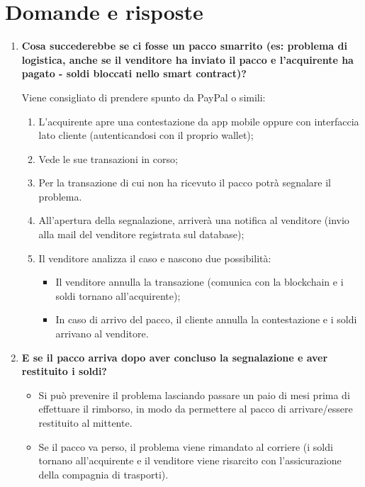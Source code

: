 \documentclass[11pt]{article}
\begin{document}
		\newpage
		
		\section{Domande e risposte}
			\begin{enumerate}
				\item \textbf{Cosa succederebbe se ci fosse un pacco smarrito (es: problema di logistica, anche se il venditore
				ha inviato il pacco e l'acquirente ha pagato - soldi bloccati nello smart contract)?}
				
				\medskip		
						
				Viene consigliato di prendere spunto da PayPal o simili: 
				\begin{enumerate}
					\item L'acquirente apre una contestazione da app mobile oppure con interfaccia lato cliente
					(autenticandosi con il proprio wallet);
					\item Vede le sue transazioni in corso;
					\item Per la transazione di cui non ha ricevuto il pacco potrà segnalare il problema.
					\item All'apertura della segnalazione, arriverà una notifica al venditore (invio alla mail del venditore
					registrata sul database);
					\item Il venditore analizza il caso e nascono due possibilità: 
						\begin{itemize}
							\item Il venditore annulla la transazione (comunica con la blockchain e i soldi tornano all'acquirente); 
							\item In caso di arrivo del pacco, il cliente annulla la contestazione e i soldi arrivano
							al venditore.
						\end{itemize}
				\end{enumerate}
				
				\bigskip
				
				\item \textbf{E se il pacco arriva dopo aver concluso la segnalazione e aver restituito i soldi?}
				
				\medskip
				
				\begin{itemize}
					\item Si può prevenire il problema lasciando passare un paio di mesi prima di effettuare il rimborso,
					in modo da permettere al pacco di arrivare/essere restituito al mittente.
					\item Se il pacco va perso, il problema viene rimandato al corriere (i soldi tornano all'acquirente e il
					venditore viene risarcito con l'assicurazione della compagnia di trasporti).
				\end{itemize}
				

\end{enumerate}
\end{document}
